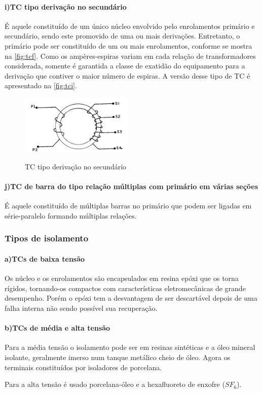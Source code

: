 \documentclass[a5paper,english,spanish,brazil]{ufsc-thesis}
\begin{document}
				\paragraph*{i)\indent TC tipo derivação no secundário}
					É aquele constituído de um único núcleo envolvido pelo enrolamentos primário e secundário, sendo este promovido de uma ou mais derivações. Entretanto, o primário pode ser constituído de um ou mais enrolamentos, conforme se mostra na \autoref{fig:tcf}. Como os ampères-espiras variam em cada relação de transformadores considerada, somente é garantida a classe de  exatidão do equipamento para a derivação que contiver o maior número de espiras. A versão desse tipo de TC é apresentado na \autoref{fig:tci}.  
					\begin{figure}[htb]
						\caption{TC tipo derivação no secundário}
						\centering
						\includegraphics[width=5.4cm]{TC(9).png}
						\label{fig:tci}
					\end{figure}
				\paragraph*{j)\indent TC de barra do tipo relação múltiplas com primário em várias seções}
					É aquele constituído de múltiplas barras no primário que podem ser ligadas em série-paralelo formando múltiplas relações.
			
			\subsubsection{Tipos de isolamento}
				\paragraph*{a)\indent TCs de baixa tensão}
					Os núcleo e os enrolamentos são encapsulados em resina epóxi que os torna rígidos, tornando-os compactos com características eletromecânicas de grande desempenho. Porém o epóxi tem a desvantagem de ser descartável depois de uma falha interna não sendo possível sua recuperação.
				\paragraph*{b)\indent TCs de média e alta tensão}
					Para a média tensão o isolamento pode ser em resinas sintéticas e a óleo mineral isolante, geralmente imerso num tanque metálico cheio de óleo. Agora os terminais constituídos por isoladores de porcelana.\par
					Para a alta tensão é usado porcelana-óleo e a hexafluoreto de enxofre ($SF_6$).\par
\end{document}
